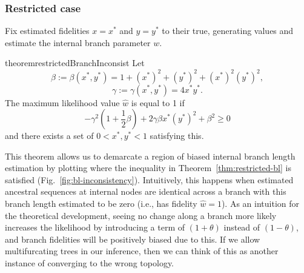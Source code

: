 \documentclass{article}
\begin{document}
\subsubsection*{Restricted case}

Fix estimated fidelities $x=x^*$ and $y=y^*$ to their true, generating values and estimate the internal branch parameter $w$.
\begin{restatable}{theorem}{restrictedBranchInconsist}
\label{thm:restricted-bl}
Let
$$
\beta := \beta(x^*, y^*) = 1+(x^*)^2+(y^*)^2+(x^*)^2(y^*)^2,
$$
$$
\gamma := \gamma(x^*, y^*) = 4x^*y^*.
$$
The maximum likelihood value $\hat{w}$ is equal to 1 if
$$
-\gamma^2\left(1 + \frac{1}{2}\beta\right) + 2\gamma\beta x^*(y^*)^2 + \beta^2 \ge 0
$$
and there exists a set of $0 < x^*, y^* < 1$ satisfying this.
\end{restatable}
This theorem allows us to demarcate a region of biased internal branch length estimation by plotting where the inequality in Theorem~\ref{thm:restricted-bl} is satisfied (Fig.~\ref{fig:bl-inconsistency}).
Intuitively, this happens when estimated ancestral sequences at internal nodes are identical across a branch with this branch length estimated to be zero (i.e., has fidelity $\hat{w} = 1$).
As an intuition for the theoretical development, seeing no change along a branch more likely increases the likelihood by introducing a term of $(1+\theta)$ instead of $(1-\theta)$, and branch fidelities will be positively biased due to this.
If we allow multifurcating trees in our inference, then we can think of this as another instance of converging to the wrong topology.
\end{document}
